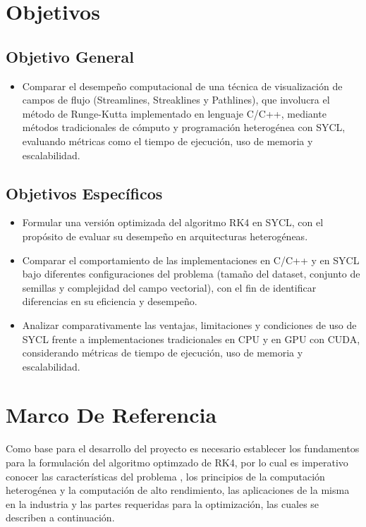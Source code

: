 \documentclass[12pt]{article}
\begin{document}
\section{Objetivos}
\subsection{Objetivo General}
\begin{itemize}

	\item Comparar el desempeño computacional de una técnica de visualización de campos de flujo (Streamlines, Streaklines y Pathlines), que involucra el método de Runge-Kutta implementado en lenguaje C/C++, mediante métodos tradicionales de cómputo y programación heterogénea con SYCL, evaluando métricas como el tiempo de ejecución, uso de memoria y escalabilidad.
\end{itemize}

\subsection{Objetivos Específicos}
\begin{itemize}
	\item Formular una versión optimizada del algoritmo RK4 en SYCL, con el propósito de evaluar su desempeño en arquitecturas heterogéneas.
	\item Comparar el comportamiento de las implementaciones en C/C++ y en SYCL bajo diferentes configuraciones del problema (tamaño del dataset, conjunto de semillas y complejidad del campo vectorial), con el fin de identificar diferencias en su eficiencia y desempeño.
	\item Analizar comparativamente las ventajas, limitaciones y condiciones de uso de SYCL frente a implementaciones tradicionales en CPU y en GPU con CUDA, considerando métricas de tiempo de ejecución, uso de memoria y escalabilidad.
\end{itemize}


\section{Marco De Referencia}

Como base para el desarrollo del proyecto es necesario establecer los fundamentos para la formulación del algoritmo optimzado de RK4, por lo cual es imperativo conocer las características del problema , los principios de la computación heterogénea y la computación de alto rendimiento, las aplicaciones de la misma en la industria y las partes requeridas para la optimización, las cuales se describen a continuación.
\end{document}
